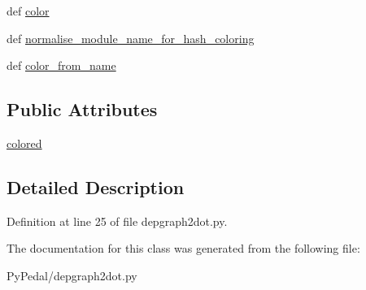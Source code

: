 \begin{CompactItemize}
\item 
\hypertarget{classPyPedal_1_1depgraph2dot_1_1pydepgraphdot_64e7eaddefc342436a624a72c6cb88c3}{
def \hyperlink{classPyPedal_1_1depgraph2dot_1_1pydepgraphdot_64e7eaddefc342436a624a72c6cb88c3}{color}}
\label{classPyPedal_1_1depgraph2dot_1_1pydepgraphdot_64e7eaddefc342436a624a72c6cb88c3}

\item 
\hypertarget{classPyPedal_1_1depgraph2dot_1_1pydepgraphdot_8709d3131ad84de457833e3fd65c9e57}{
def \hyperlink{classPyPedal_1_1depgraph2dot_1_1pydepgraphdot_8709d3131ad84de457833e3fd65c9e57}{normalise\_\-module\_\-name\_\-for\_\-hash\_\-coloring}}
\label{classPyPedal_1_1depgraph2dot_1_1pydepgraphdot_8709d3131ad84de457833e3fd65c9e57}

\item 
\hypertarget{classPyPedal_1_1depgraph2dot_1_1pydepgraphdot_2a0d7f3123e8bd01b39e31ffe687acdd}{
def \hyperlink{classPyPedal_1_1depgraph2dot_1_1pydepgraphdot_2a0d7f3123e8bd01b39e31ffe687acdd}{color\_\-from\_\-name}}
\label{classPyPedal_1_1depgraph2dot_1_1pydepgraphdot_2a0d7f3123e8bd01b39e31ffe687acdd}

\end{CompactItemize}
\subsection*{Public Attributes}
\begin{CompactItemize}
\item 
\hypertarget{classPyPedal_1_1depgraph2dot_1_1pydepgraphdot_319ccda79a1a845fe38619c365d125ae}{
\hyperlink{classPyPedal_1_1depgraph2dot_1_1pydepgraphdot_319ccda79a1a845fe38619c365d125ae}{colored}}
\label{classPyPedal_1_1depgraph2dot_1_1pydepgraphdot_319ccda79a1a845fe38619c365d125ae}

\end{CompactItemize}


\subsection{Detailed Description}


Definition at line 25 of file depgraph2dot.py.

The documentation for this class was generated from the following file:\begin{CompactItemize}
\item 
PyPedal/depgraph2dot.py\end{CompactItemize}
